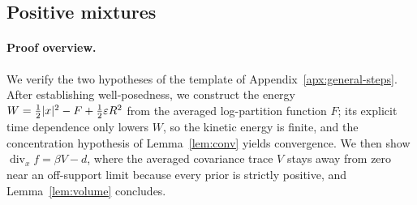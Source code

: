 \documentclass{article} %
\theoremstyle{plain}
\theoremstyle{definition}
\theoremstyle{remark}
\begin{document}
\subsection{Positive mixtures}
\label{apx:pf-posmix}

\thmposmix*
\paragraph{Proof overview.} We verify the two hypotheses of the template of
Appendix~\ref{apx:general-steps}. After establishing well-posedness, we construct the energy
$W=\tfrac12|x|^2-F+\tfrac12\varepsilon R^2$ from the averaged log-partition function $F$; its explicit
time dependence only lowers $W$, so the kinetic energy is finite, and the concentration hypothesis
of Lemma~\ref{lem:conv} yields convergence. We then show $\operatorname{div}_xf=\beta V-d$, where
the averaged covariance trace $V$ stays away from zero near an off-support limit because every prior is
strictly positive, and Lemma~\ref{lem:volume} concludes.
\end{document}
